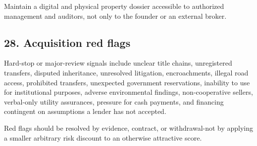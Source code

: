 Maintain a digital and physical property dossier accessible to authorized management and auditors, not only to the founder or an external broker.


\subsection{28. Acquisition red flags}

Hard-stop or major-review signals include unclear title chains, unregistered transfers, disputed inheritance, unresolved litigation, encroachments, illegal road access, prohibited transfers, unexpected government reservations, inability to use for institutional purposes, adverse environmental findings, non-cooperative sellers, verbal-only utility assurances, pressure for cash payments, and financing contingent on assumptions a lender has not accepted.

Red flags should be resolved by evidence, contract, or withdrawal-not by applying a smaller arbitrary risk discount to an otherwise attractive score.
